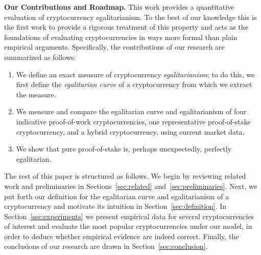 
\noindent
\textbf{Our Contributions and Roadmap.}
This work provides a quantitative evaluation of cryptocurrency egalitarianism.
To the best of our knowledge this is the first work to provide a rigorous
treatment of this property and acts as the foundations of evaluating
cryptocurrencies in ways more formal than plain empirical arguments.
Specifically, the contributions of our research are summarized as follows:

\begin{enumerate}
  \item We define an exact measure of cryptocurrency
        \emph{egalitarianism}; to do this, we first define the \emph{egalitarian curve} of a
        cryptocurrency from which we extract the measure.
  \item We measure and compare the egalitarian curve and egalitarianism of
        four indicative proof-of-work cryptocurrencies, one representative
        proof-of-stake cryptocurrency, and a hybrid cryptocurrency, using
        current market data.
  \item We show that pure proof-of-stake is, perhaps unexpectedly, perfectly
        egalitarian.
\end{enumerate}

The rest of this paper is structured as follows. We begin by reviewing related
work and preliminaries in Sections~\ref{sec:related}
and~\ref{sec:preliminaries}. Next, we put forth our definition for the
egalitarian curve and egalitarianism of a cryptocurrency and motivate its
intuition in Section~\ref{sec:definition}. In Section~\ref{sec:experiments} we
present empirical data for several cryptocurrencies of interest and evaluate
the most popular cryptocurrencies under our model, in order to deduce whether
empirical evidence are indeed correct. Finally, the conclusions of our research
are drawn in Section~\ref{sec:conclusion}.
